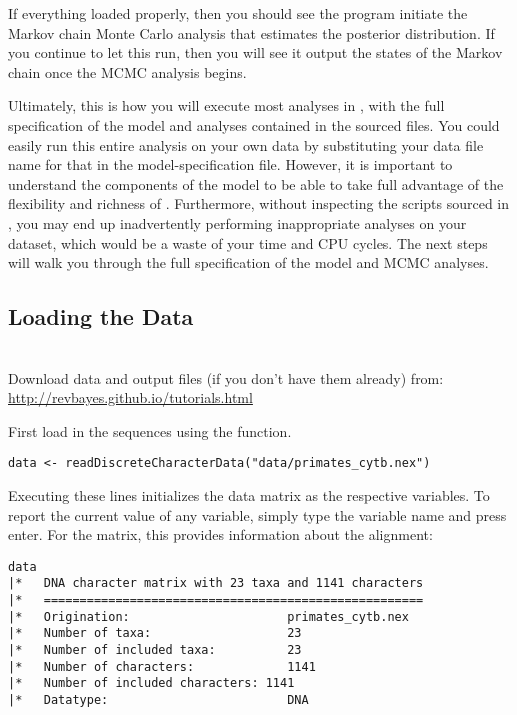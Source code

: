 If everything loaded properly, then you should see the program initiate the Markov chain Monte Carlo analysis that estimates the posterior distribution. 
If you continue to let this run, then you will see it output the states of the Markov chain once the MCMC analysis begins. 

Ultimately, this is how you will execute most analyses in \RevBayes, with the full specification of the model and analyses contained in the sourced files. 
You could easily run this entire analysis on your own data by substituting your data file name for that in the model-specification file. 
However, it is important to understand the components of the model to be able to take full advantage of the flexibility and richness of \RevBayes.
Furthermore, without inspecting the \Rev scripts sourced in , you may end up inadvertently performing inappropriate analyses on your dataset, which would be a waste of your time and CPU cycles. 
The next steps will walk you through the full specification of the model and MCMC analyses. 

\bigskip

\subsection{Loading the Data}

\noindent \\ \impmark Download data and output files (if you don't have them already) from: \\ \href{http://revbayes.github.io/tutorials.html}{http://revbayes.github.io/tutorials.html}


First load in the sequences using the  function. 
{\tt \begin{snugshade*}
\begin{lstlisting}
data <- readDiscreteCharacterData("data/primates_cytb.nex")
\end{lstlisting}
\end{snugshade*}}
Executing these lines initializes the data matrix as the respective \Rev variables. 
To report the current value of any variable, simply type the variable name and press enter. For the  matrix, this provides information about the alignment:
{\tt \begin{snugshade*}
\begin{lstlisting}
data
|*   DNA character matrix with 23 taxa and 1141 characters
|*   =====================================================
|*   Origination:                      primates_cytb.nex
|*   Number of taxa:                   23
|*   Number of included taxa:          23
|*   Number of characters:             1141
|*   Number of included characters: 1141
|*   Datatype:                         DNA
\end{lstlisting}
\end{snugshade*}}


